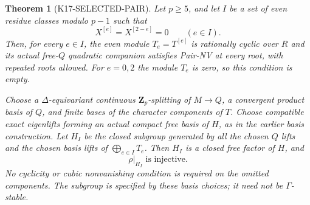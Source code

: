 \documentclass[11pt,a4paper]{article}
\newtheorem{theorem}{Theorem}[section]
\theoremstyle{definition}
\begin{document}
\begin{theorem}[K17-SELECTED-PAIR]
\label{thm:selected-pair-faithfulness}
Let $p\geq5$, and let $I$ be a set of even residue classes
modulo $p-1$ such that
\[
                 X^{[e]}=X^{[2-e]}=0\qquad(e\in I).
 \tag{SP.1}
\]
Then, for every $e\in I$, the even module $T_e=T^{[e]}$
is rationally cyclic over $R$ and its actual free-$Q$ quadratic
companion satisfies Pair-NV at every root, with repeated roots
allowed. For $e=0,2$ the module $T_e$ is zero, so this condition
is empty.

Choose a $\Delta$-equivariant continuous $\mathbf Z_p$-splitting
of $M\to Q$, a convergent product basis of $Q$, and finite
bases of the character components of $T$. Choose compatible
exact eigenlifts forming an actual compact free basis of $H$,
as in the earlier basis construction. Let $H_I$ be the closed
subgroup generated by all the chosen $Q$ lifts and the chosen
basis lifts of $\bigoplus_{e\in I}T_e$. Then $H_I$ is a closed
free factor of $H$, and
\[
                         \rho|_{H_I}\text{ is injective}.
 \tag{SP.2}
\]
No cyclicity or cubic nonvanishing condition is required on
the omitted components. The subgroup is specified by these
basis choices; it need not be $\Gamma$-stable.
\end{theorem}
\end{document}
